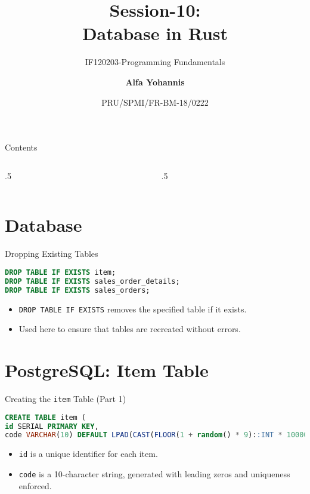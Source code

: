 \documentclass[aspectratio=169, table]{beamer}
\subtitle{IF120203-Programming Fundamentals}
\title{Session-10:\\\LARGE{Database in Rust}\\ \vspace{15pt}}
\date[Serial]{\scriptsize {PRU/SPMI/FR-BM-18/0222}}
\author[Pradita]{\small{\textbf{Alfa Yohannis}}}
\begin{document}
\frame{\titlepage}

\begin{frame}{Contents}
\vspace{15pt}
\begin{columns}[t]
\begin{column}{.5\textwidth}
	\tableofcontents[sections={1-12}]
\end{column}
\begin{column}{.5\textwidth}
	\tableofcontents[sections={13-24}]
\end{column}
\end{columns}
\end{frame}


\section{Database}
\begin{frame}[fragile]{Dropping Existing Tables}

\begin{lstlisting}[language=Sql]
DROP TABLE IF EXISTS item;
DROP TABLE IF EXISTS sales_order_details;
DROP TABLE IF EXISTS sales_orders;
\end{lstlisting}

\begin{itemize}
\item \texttt{DROP TABLE IF EXISTS} removes the specified table if it exists.
\item Used here to ensure that tables are recreated without errors.
\end{itemize}
\end{frame}

\section{PostgreSQL: Item Table}
\begin{frame}[fragile]{Creating the \texttt{item} Table (Part 1)}
\vspace{15pt}
\begin{lstlisting}[language=Sql]
CREATE TABLE item (
id SERIAL PRIMARY KEY,
code VARCHAR(10) DEFAULT LPAD(CAST(FLOOR(1 + random() * 9)::INT * 1000000000 + FLOOR(random() * 1000000000)::INT AS VARCHAR), 10, '0') NOT NULL UNIQUE,
\end{lstlisting}

\begin{itemize}
\item \texttt{id} is a unique identifier for each item.
\item \texttt{code} is a 10-character string, generated with leading zeros and uniqueness enforced.
\end{itemize}
\end{frame}
\end{document}
